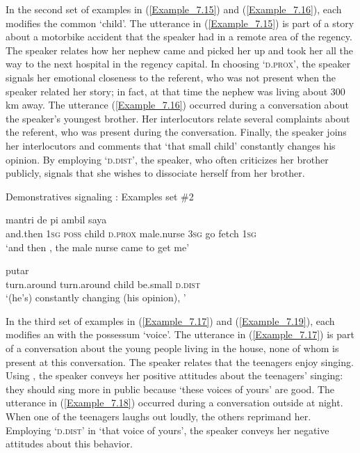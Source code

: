 {In the second set of examples in (\ref{Example_7.15}) and (\ref{Example_7.16}), each  modifies the common   ‘child’. The utterance in (\ref{Example_7.15}) is part of a story about a motorbike accident that the speaker had in a remote area of the regency. The speaker relates how her nephew came and picked her up and took her all the way to the next hospital in the regency capital. In choosing  ‘\textsc{d.prox}’, the speaker signals her emotional closeness to the referent, who was not present when the speaker related her story; in fact, at that time the nephew was living about 300 km away. The utterance (\ref{Example_7.16}) occurred during a conversation about the speaker’s youngest brother. Her interlocutors relate several complaints about the referent, who was present during the conversation. Finally, the speaker joins her interlocutors and comments that  ‘that small child’ constantly changes his opinion. By employing  ‘\textsc{d.dist}’, the speaker, who often criticizes her brother publicly, signals that she wishes to dissociate herself from her brother.

\begin{styleExampleTitle}
Demonstratives signaling : Examples set \#2
\end{styleExampleTitle}

\ea
\label{Example_7.15}
 {} {} {} {} {mantri} {de} {pi} {ambil} {saya}\\ %
 and.then  \textsc{1sg}  \textsc{poss}  child  \textsc{d.prox}  male.nurse  \textsc{3sg}  go  fetch  \textsc{1sg}\\
\glt 
‘and then , the male nurse came to get me’ \textstyleExampleSource{[081015-005-NP.0044]}
\z

\ea
\label{Example_7.16}
 {putar} {} {} {}\\ %
 turn.around  turn.around  child  be.small  \textsc{d.dist}\\
\glt 
‘(he’s) constantly changing (his opinion), ’ \textstyleExampleSource{[081011-003-Cv.0016]}
\z



In the third set of examples in (\ref{Example_7.17}) and (\ref{Example_7.19}), each  modifies an  with the possessum  ‘voice’. The utterance in (\ref{Example_7.17}) is part of a conversation about the young people living in the house, none of whom is present at this conversation. The speaker relates that the teenagers enjoy singing. Using , the speaker conveys her positive attitudes about the teenagers’ singing: they should sing more in public because  ‘these voices of yours’ are good. The utterance in (\ref{Example_7.18}) occurred during a conversation outside at night. When one of the teenagers laughs out loudly, the others reprimand her. Employing  ‘\textsc{d.dist}’ in  ‘that voice of yours’, the speaker conveys her negative attitudes about this behavior.


}
